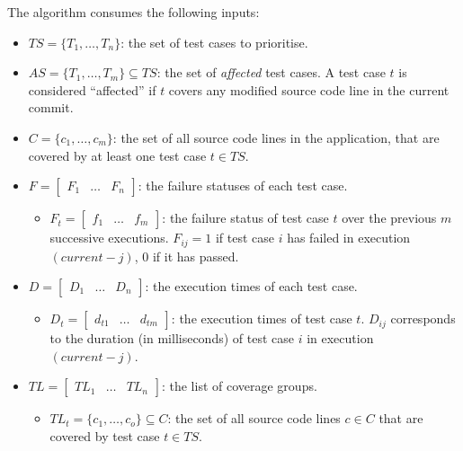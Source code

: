 \noindent The algorithm consumes the following inputs:
\begin{itemize}
	\item $TS = \{T_1, \dots, T_n\}$: the set of test cases to prioritise.
	
	\item $AS = \{T_1, \dots, T_m\} \subseteq TS$: the set of \emph{affected} test cases. A test case $t$ is considered ``affected'' if $t$ covers any modified source code line in the current commit.
	
	\item $C = \{c_1, \dots, c_m\}$: the set of all source code lines in the application, that are covered by at least one test case $t \in TS$.
	
	\item $F = \begin{bmatrix}
			F_1 & \dots & F_n
		\end{bmatrix}$: the failure statuses of each test case.
			\begin{itemize}
				\item $F_t = \begin{bmatrix}
					f_1 & \dots & f_m
				\end{bmatrix}$: the failure status of test case $t$ over the previous $m$ successive executions. $F_{ij} = 1$ if test case $i$ has failed in execution $(current - j)$, $0$ if it has passed.
			\end{itemize}
			
	\item $D = \begin{bmatrix}
			D_1 & \dots & D_n
		\end{bmatrix}$: the execution times of each test case.
			\begin{itemize}
				\item $D_t = \begin{bmatrix}
					d_{t1} & \dots & d_{tm}
				\end{bmatrix}$: the execution times of test case $t$. $D_{ij}$ corresponds to the duration (in milliseconds) of test case $i$ in execution $(current - j)$.
			\end{itemize}
	
	\item $TL = \begin{bmatrix}
			TL_1 & \dots & TL_n
		\end{bmatrix}$: the list of coverage groups.
			\begin{itemize}
				\item $TL_t = \{c_1, \dots, c_o\} \subseteq C$: the set of all source code lines $c \in C$ that are covered by test case $t \in TS$.
			\end{itemize}
\end{itemize}

